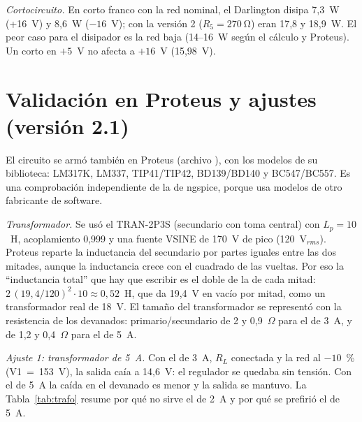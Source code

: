 \documentclass[conference]{IEEEtran}
\begin{document}
\textit{Cortocircuito.} En corto franco con la red nominal, el Darlington disipa 7,3~W (+16~V) y 8,6~W ($-16$~V); con la versión 2 ($R_5=\SI{270}{\ohm}$) eran 17,8 y 18,9~W. El peor caso para el disipador es la red baja (14--16~W según el cálculo y Proteus). Un corto en $+5$~V no afecta a $+16$~V (15,98~V).

\section{Validación en Proteus y ajustes (versión 2.1)}
\label{sec:proteus}
El circuito se armó también en Proteus (archivo ), con los modelos de su biblioteca: LM317K, LM337, TIP41/TIP42, BD139/BD140 y BC547/BC557. Es una comprobación independiente de la de ngspice, porque usa modelos de otro fabricante de software.

\textit{Transformador.} Se usó el TRAN-2P3S (secundario con toma central) con $L_p=10$~H, acoplamiento 0,999 y una fuente VSINE de 170~V de pico (120~V$_{rms}$). Proteus reparte la inductancia del secundario por partes iguales entre las dos mitades, aunque la inductancia crece con el cuadrado de las vueltas. Por eso la ``inductancia total'' que hay que escribir es el doble de la de cada mitad: $2\,(19{,}4/120)^2\cdot10\approx0{,}52$~H, que da 19,4~V en vacío por mitad, como un transformador real de 18~V. El tamaño del transformador se representó con la resistencia de los devanados: primario/secundario de 2 y 0,9~$\Omega$ para el de 3~A, y de 1,2 y 0,4~$\Omega$ para el de 5~A.

\textit{Ajuste 1: transformador de 5~A.} Con el de 3~A, $R_L$ conectada y la red al $-10$~\% (V1~=~153~V), la salida caía a 14,6~V: el regulador se quedaba sin tensión. Con el de 5~A la caída en el devanado es menor y la salida se mantuvo. La Tabla~\ref{tab:trafo} resume por qué no sirve el de 2~A y por qué se prefirió el de 5~A.

\begin{table}[htbp]
\caption{Comparación de transformadores 18-0-18~V (un riel a 1,67~A)}
\label{tab:trafo}
\centering
\scriptsize\setlength{\tabcolsep}{3pt}
\end{table}
\end{document}
